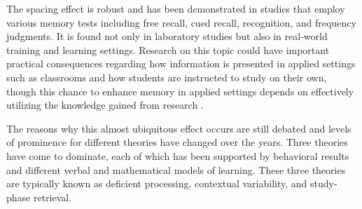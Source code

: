 
The spacing effect is robust and has been demonstrated in studies that employ various memory tests including free recall, cued recall, recognition, and frequency judgments.  It is found not only in laboratory studies but also in real-world training and learning settings.  Research on this topic could have important practical consequences regarding how information is presented in applied settings such as classrooms \cite{CarpEtal2012,DunlEtal2013,KhajEtal2014} and how students are instructed to study on their own, though this chance to enhance memory in applied settings depends on effectively utilizing the knowledge gained from research \cite{Demp1988,PashEtal2007}.

The reasons why this almost ubiquitous effect occurs are still debated and levels of prominence for different theories have changed over the years.  Three theories have come to dominate, each of which has been supported by behavioral results and different verbal and mathematical models of learning.  These three theories are typically known as deficient processing, contextual variability, and study-phase retrieval.


